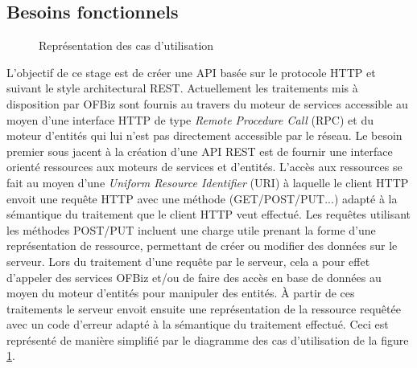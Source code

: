 \documentclass[a4paper, 11pt]{report}
\begin{document}
\subsection{Besoins fonctionnels}

\begin{figure}
  \centering
  \caption{Représentation des cas d'utilisation}
  \label{fig:needs}
\end{figure}

L'objectif de ce stage est de créer une API basée sur le protocole
HTTP et suivant le style architectural REST.  Actuellement les
traitements mis à disposition par OFBiz sont fournis au travers du
moteur de services accessible au moyen d'une interface HTTP de type
\emph{Remote Procedure Call} (RPC) et du moteur d'entités qui lui
n'est pas directement accessible par le réseau.  Le besoin premier
sous jacent à la création d'une API REST est de fournir une interface
orienté ressources aux moteurs de services et d'entités.  L'accès aux
ressources se fait au moyen d'une \emph{Uniform Resource Identifier}
(URI) à laquelle le client HTTP envoit une requête HTTP avec une
méthode (GET/POST/PUT...) adapté à la sémantique du traitement que le
client HTTP veut effectué.  Les requêtes utilisant les méthodes
POST/PUT incluent une charge utile prenant la forme d'une
représentation de ressource, permettant de créer ou modifier des
données sur le serveur.  Lors du traitement d'une requête par le
serveur, cela a pour effet d'appeler des services OFBiz et/ou de faire
des accès en base de données au moyen du moteur d'entités pour
manipuler des entités.  À partir de ces traitements le serveur envoit
ensuite une représentation de la ressource requêtée avec un code
d'erreur adapté à la sémantique du traitement effectué.  Ceci est
représenté de manière simplifié par le diagramme des cas d'utilisation
de la figure \ref{fig:needs}.
\end{document}
